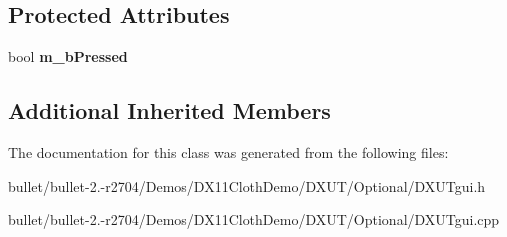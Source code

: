 \subsection*{Protected Attributes}
\begin{DoxyCompactItemize}
\item 
\hypertarget{class_c_d_x_u_t_button_ae60b08141abedf4b709e01ac6c8e6940}{bool {\bfseries m\+\_\+b\+Pressed}}\label{class_c_d_x_u_t_button_ae60b08141abedf4b709e01ac6c8e6940}

\end{DoxyCompactItemize}
\subsection*{Additional Inherited Members}


The documentation for this class was generated from the following files\+:\begin{DoxyCompactItemize}
\item 
bullet/bullet-\/2.-\/r2704/\+Demos/\+D\+X11\+Cloth\+Demo/\+D\+X\+U\+T/\+Optional/D\+X\+U\+Tgui.\+h\item 
bullet/bullet-\/2.-\/r2704/\+Demos/\+D\+X11\+Cloth\+Demo/\+D\+X\+U\+T/\+Optional/D\+X\+U\+Tgui.\+cpp\end{DoxyCompactItemize}
